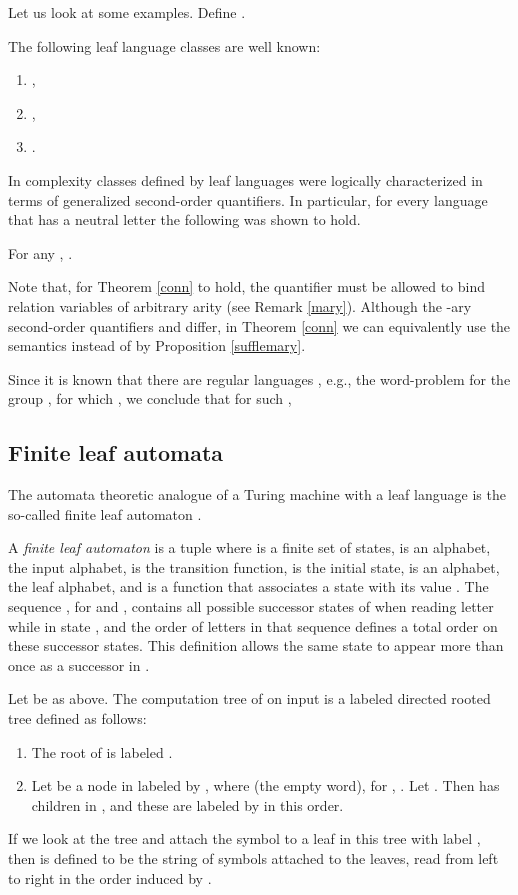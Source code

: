 \documentclass{LMCS}
\begin{document}
Let us look at some examples. Define . 
\begin{exa} The following leaf language classes are well known:
\begin{enumerate}[]
\item ,
\item ,
\item .
\end{enumerate}
\end{exa}
\noindent
In \cite{buvo98} complexity classes defined by  leaf languages were  logically characterized in terms of generalized second-order quantifiers. In particular, for every language  that has a
 neutral letter the following was shown to hold. 
\begin{thm}\label{conn}
For any , .
\end{thm}
Note that, for Theorem \ref{conn} to hold, the quantifier  must be
allowed to bind relation variables of arbitrary arity (see Remark \ref{mary}). 
Although the -ary second-order quantifiers  and   differ, in Theorem \ref{conn} we can equivalently use the semantics  instead of    by Proposition \ref{sufflemary}. 




Since it is known that there are regular languages , e.g., the word-problem for
the group , for which  \cite{helascvowa93}, we conclude that for
such ,

\subsection{Finite leaf automata}
The automata theoretic analogue of a Turing machine with a leaf language is the so-called finite leaf automaton \cite{pevo01}.

A \emph{finite leaf automaton} is a tuple
 where  is a finite set of
states,  is an alphabet, the input alphabet,
 is the transition
function,  is the  initial state,  is an
alphabet, the  leaf alphabet, and  is a function that associates a state  with its
 value .  The sequence , for 
and , contains all possible successor states of  when
reading letter  while in state , and the order of letters in
that sequence defines a total order on these successor states.
This definition allows the same state to appear more than once as a
successor in .

Let  be as above.  The computation tree  of  on input
 is a labeled directed rooted tree defined as follows:
\begin{enumerate}[]
\item The root of  is labeled .
\item Let  be a node in  labeled by , where
 (the empty word),  for ,
.  Let . Then  has 
children in , and these are labeled by
 in this order.
\end{enumerate}
If we look at the tree  and attach the symbol  to a
leaf in this tree with label , then  is
defined to be the string of symbols attached to the leaves, read from
left to right in the order induced by .
\end{document}
